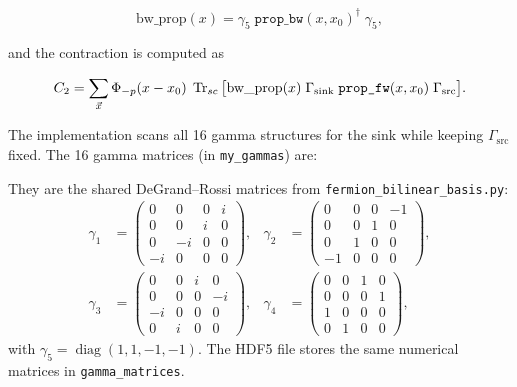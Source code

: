 \documentclass[11pt,a4paper]{article}
\newcommand{\code}[1]{\texttt{#1}}
\begin{document}
\begin{equation}\label{eq:bw_prop}
  \text{bw\_prop}(x) = \gamma_5\; \texttt{prop\_bw}(x, x_0)^\dagger\; \gamma_5,
\end{equation}

and the contraction is computed as

\begin{equation}\label{eq:C2_code}
  C_2 = \sum_{\vec{x}} \Phi_{-p}(x - x_0)\;
        \Tr_{sc}\big[
          \text{bw\_prop}(x)\; \Gamma_{\text{sink}}\;
          \texttt{prop\_fw}(x, x_0)\; \Gamma_{\text{src}}
        \big].
\end{equation}

The implementation scans all 16 gamma structures for the sink while keeping $\Gamma_{\text{src}}$ fixed. The 16 gamma matrices (in \code{my\_gammas}) are:

They are the shared DeGrand--Rossi matrices from
\code{fermion\_bilinear\_basis.py}:
\begin{align}
\gamma_1&=\begin{pmatrix}0&0&0&i\\0&0&i&0\\0&-i&0&0\\-i&0&0&0\end{pmatrix},&
\gamma_2&=\begin{pmatrix}0&0&0&-1\\0&0&1&0\\0&1&0&0\\-1&0&0&0\end{pmatrix},\\
\gamma_3&=\begin{pmatrix}0&0&i&0\\0&0&0&-i\\-i&0&0&0\\0&i&0&0\end{pmatrix},&
\gamma_4&=\begin{pmatrix}0&0&1&0\\0&0&0&1\\1&0&0&0\\0&1&0&0\end{pmatrix},
\end{align}
with $\gamma_5=\operatorname{diag}(1,1,-1,-1)$.  The HDF5 file stores the
same numerical matrices in \code{gamma\_matrices}.
\end{document}
